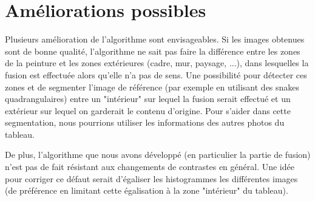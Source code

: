 \documentclass[12pt,a4paper]{article}
\begin{document}
\section{Améliorations possibles}

Plusieurs amélioration de l'algorithme sont envisageables. Si les images obtenues sont de bonne qualité, l'algorithme ne sait pas faire la différence entre les zones de la peinture et les zones extérieures (cadre, mur, paysage, ...), dans lesquelles la fusion est effectuée alors qu'elle n'a pas de sens. Une possibilité pour détecter ces zones et de segmenter l'image de référence (par exemple en utilisant des snakes quadrangulaires) entre un "intérieur" sur lequel la fusion serait effectué et un extérieur sur lequel on garderait le contenu d'origine. Pour s'aider dans cette segmentation, nous pourrions utiliser les informations des autres photos du tableau.

De plus, l'algorithme que nous avons développé (en particulier la partie de fusion) n'est pas de fait résistant aux changements de contrastes en général. Une idée pour corriger ce défaut serait d'égaliser les histogrammes les différentes images (de préférence en limitant cette égalisation à la zone "intérieur" du tableau).


\end{document}
